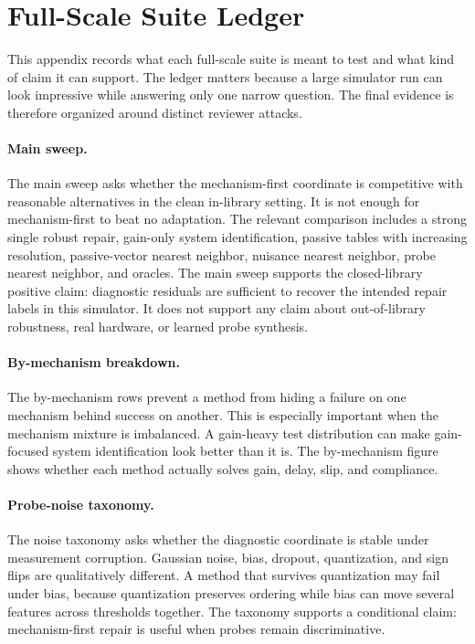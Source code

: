 \documentclass{article}
\begin{document}
\section{Full-Scale Suite Ledger}

This appendix records what each full-scale suite is meant to test and what kind
of claim it can support. The ledger matters because a large simulator run can
look impressive while answering only one narrow question. The final evidence is
therefore organized around distinct reviewer attacks.

\paragraph{Main sweep.}
The main sweep asks whether the mechanism-first coordinate is competitive with
reasonable alternatives in the clean in-library setting. It is not enough for
mechanism-first to beat no adaptation. The relevant comparison includes a strong
single robust repair, gain-only system identification, passive tables with
increasing resolution, passive-vector nearest neighbor, nuisance nearest
neighbor, probe nearest neighbor, and oracles. The main sweep supports the
closed-library positive claim: diagnostic residuals are sufficient to recover
the intended repair labels in this simulator. It does not support any claim
about out-of-library robustness, real hardware, or learned probe synthesis.

\paragraph{By-mechanism breakdown.}
The by-mechanism rows prevent a method from hiding a failure on one mechanism
behind success on another. This is especially important when the mechanism
mixture is imbalanced. A gain-heavy test distribution can make gain-focused
system identification look better than it is. The by-mechanism figure shows
whether each method actually solves gain, delay, slip, and compliance.

\paragraph{Probe-noise taxonomy.}
The noise taxonomy asks whether the diagnostic coordinate is stable under
measurement corruption. Gaussian noise, bias, dropout, quantization, and sign
flips are qualitatively different. A method that survives quantization may fail
under bias, because quantization preserves ordering while bias can move several
features across thresholds together. The taxonomy supports a conditional claim:
mechanism-first repair is useful when probes remain discriminative.
\end{document}
